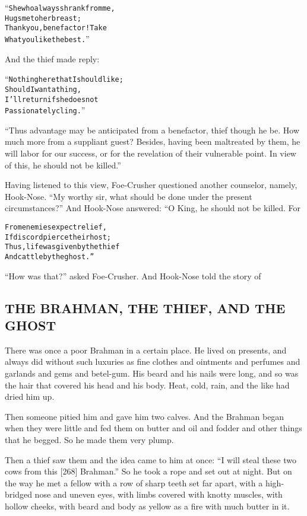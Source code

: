\documentclass{article}
\renewenvironment{verbatim}{\begin{alltt}\normalfont\begin{centering}}{\end{centering}\end{alltt}}
\begin{document}
\begin{verbatim}
“She who always shrank from me,
Hugs me to her breast;
Thank you, benefactor! Take
What you like the best.”
\end{verbatim}
And the thief made reply:

\begin{verbatim}
“Nothing here that I should like;
Should I want a thing,
I'll return if she does not
Passionately cling.”                                    
\end{verbatim}
``Thus advantage may be anticipated from a benefactor, thief though he be. How much more from a suppliant guest? Besides, having been maltreated by them, he will labor for our success, or for the revelation of their vulnerable point. In view of this, he should not be killed.''

Having listened to this view, Foe-Crusher questioned another
counselor, namely, Hook-Nose.
``My worthy sir, what should be done under the present circumstances?''
And Hook-Nose answered: “O King, he should not be killed. For

\begin{verbatim}
From enemies expect relief,
    If discord pierce their host;
Thus, life was given by the thief
    And cattle by the ghost.”
\end{verbatim}
``How was that?'' asked Foe-Crusher. And Hook-Nose told the story
of

\subsection{THE BRAHMAN, THE THIEF, AND THE GHOST}

There was once a poor Brahman in a certain place. He lived on
presents, and always did without such luxuries as fine clothes and
ointments and perfumes and garlands and gems and betel-gum. His
beard and his nails were long, and so was the hair that covered his
head and his body. Heat, cold, rain, and the like had dried him
up.

Then someone pitied him and gave him two calves. And the Brahman
began when they were little and fed them on butter and oil and
fodder and other things that he begged. So he made them very
plump.

Then a thief saw them and the idea came to him at once:
``I will steal these two cows from this [268] Brahman.'' So he took
a rope and set out at night. But on the way he met a fellow with a
row of sharp teeth set far apart, with a high-bridged nose and
uneven eyes, with limbs covered with knotty muscles, with hollow
cheeks, with beard and body as yellow as a fire with much butter in
it.
\end{document}
